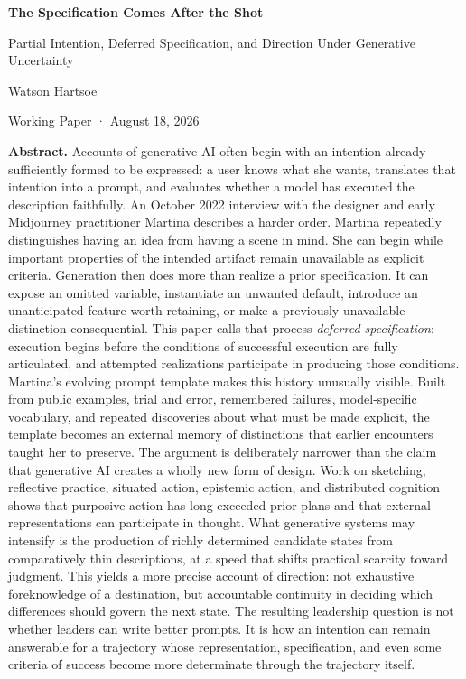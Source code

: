\documentclass[
  11pt,
  letterpaper,
]{article}
\author{}
\date{}
\begin{document}
\thispagestyle{empty}

\begin{center}
{\LARGE\bfseries The Specification Comes After the Shot\par}
\vspace{0.4em}
{\large Partial Intention, Deferred Specification, and Direction Under Generative Uncertainty\par}
\vspace{1.2em}
{\normalsize Watson Hartsoe\par}
\vspace{0.25em}
{\small Working Paper · August 18, 2026\par}
\end{center}

\vspace{1.2em}

\noindent\textbf{Abstract.} Accounts of generative AI often begin with
an intention already sufficiently formed to be expressed: a user knows
what she wants, translates that intention into a prompt, and evaluates
whether a model has executed the description faithfully. An October 2022
interview with the designer and early Midjourney practitioner Martina
describes a harder order. Martina repeatedly distinguishes having an
idea from having a scene in mind. She can begin while important
properties of the intended artifact remain unavailable as explicit
criteria. Generation then does more than realize a prior specification.
It can expose an omitted variable, instantiate an unwanted default,
introduce an unanticipated feature worth retaining, or make a previously
unavailable distinction consequential. This paper calls that process
\emph{deferred specification}: execution begins before the conditions of
successful execution are fully articulated, and attempted realizations
participate in producing those conditions. Martina's evolving prompt
template makes this history unusually visible. Built from public
examples, trial and error, remembered failures, model-specific
vocabulary, and repeated discoveries about what must be made explicit,
the template becomes an external memory of distinctions that earlier
encounters taught her to preserve. The argument is deliberately narrower
than the claim that generative AI creates a wholly new form of design.
Work on sketching, reflective practice, situated action, epistemic
action, and distributed cognition shows that purposive action has long
exceeded prior plans and that external representations can participate
in thought. What generative systems may intensify is the production of
richly determined candidate states from comparatively thin descriptions,
at a speed that shifts practical scarcity toward judgment. This yields a
more precise account of direction: not exhaustive foreknowledge of a
destination, but accountable continuity in deciding which differences
should govern the next state. The resulting leadership question is not
whether leaders can write better prompts. It is how an intention can
remain answerable for a trajectory whose representation, specification,
and even some criteria of success become more determinate through the
trajectory itself.
\end{document}
